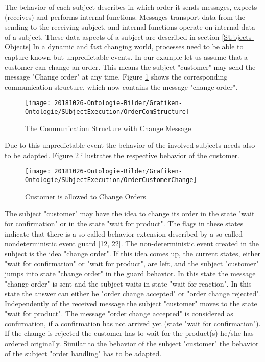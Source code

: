The behavior of each subject describes in which order it sends messages, expects (receives) and performs internal functions. Messages transport data from the sending to the receiving subject, and internal functions operate on internal data of a subject. These data aspects of a subject are described in section \ref{SUbjects-Objects} In a dynamic and fast changing world, processes need to  be able to capture known but unpredictable events. In our example let us assume that a customer can change an order. This means the subject "customer" may send the message "Change order" at any time. Figure \ref{fig:ordercomstructure} shows the corresponding communication structure, which now contains the message "change order".
\newpage
\begin{figure}[ph]
	\centering
	\texttt{[image: 20181026-Ontologie-Bilder/Grafiken-Ontologie/SUbjectExecution/OrderComStructure]}
	\caption[The Communication Structure with Change Message]{The Communication Structure with Change Message}
	\label{fig:ordercomstructure}
\end{figure}

Due to this unpredictable event the behavior of the involved subjects needs also to be adapted. Figure \ref{fig:ordercustomerchange} illustrates the respective behavior of the customer. 

\begin{figure}[ph]
	\centering
	\texttt{[image: 20181026-Ontologie-Bilder/Grafiken-Ontologie/SUbjectExecution/OrderCustomerChange]}
	\caption[Customer is allowed to Change Orders]{Customer is allowed to Change Orders}
	\label{fig:ordercustomerchange}
\end{figure}


The subject "customer" may have the idea to change its order in the state "wait for confirmation" or in the state "wait for product". The flags in these states indicate that there is a so-called behavior extension described by a so-called nondeterministic event guard [12, 22]. The non-deterministic event created in the subject is the idea "change order". If this idea comes up, the current states, either "wait for confirmation" or "wait for product", are left, and the subject "customer" jumps into state "change order" in the guard behavior. In this state the message "change order" is sent and the subject waits in state "wait for reaction". In this state the answer can either be "order change accepted" or "order change rejected". Independently of the received message the subject "customer" moves to the state "wait for product". The message "order change accepted" is considered as confirmation, if a confirmation has not arrived yet (state "wait for confirmation"). If the change is rejected the customer has to wait for the product(s) he/she has ordered originally.
Similar to the behavior of the subject "customer" the behavior of the subject "order handling" has to be adapted.



